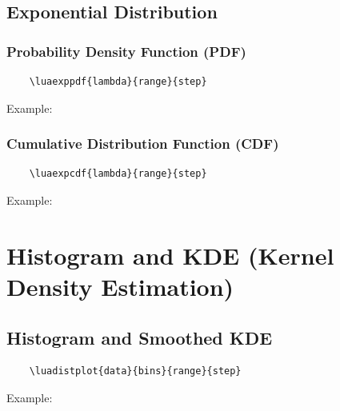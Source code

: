 \subsection{Exponential Distribution}
\subsubsection{Probability Density Function (PDF)}
\begin{verbatim}
	\luaexppdf{lambda}{range}{step}
\end{verbatim}
Example:
\begin{center}
\end{center}

\subsubsection{Cumulative Distribution Function (CDF)}
\begin{verbatim}
	\luaexpcdf{lambda}{range}{step}
\end{verbatim}
Example:
\begin{center}
\end{center}

\section{Histogram and KDE (Kernel Density Estimation)}
\subsection{Histogram and Smoothed KDE}
\begin{verbatim}
	\luadistplot{data}{bins}{range}{step}
\end{verbatim}

Example:
\begin{center}
\end{center}
